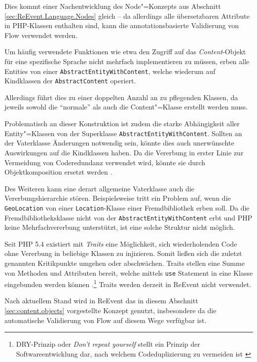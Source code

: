 Dies kommt einer Nachentwicklung des Node"=Konzepts aus Abschnitt \ref{sec:ReEvent.Language.Nodes} gleich -- da allerdings alle übersetzbaren Attribute in PHP-Klassen enthalten sind, kann die annotationsbasierte Validierung von Flow verwendet werden.

Um häufig verwendete Funktionen wie etwa den Zugriff auf das \emph{Content}-Objekt für eine spezifische Sprache nicht mehrfach implementieren zu müssen, erben alle Entities von einer \texttt{AbstractEntityWithContent}, welche wiederum auf Kindklassen der \texttt{AbstractContent} operiert.

Allerdings führt dies zu einer doppelten Anzahl an zu pflegenden Klassen, da jeweils sowohl die \enquote{normale} als auch die Content"=Klasse erstellt werden muss.

Problematisch an dieser Konstruktion ist zudem die starke Abhängigkeit aller Entity"=Klassen von der Superklasse \texttt{AbstractEntityWithContent}. Sollten an der Vaterklasse Änderungen notwendig sein, könnte dies auch unerwünschte Auswirkungen auf die Kindklassen haben. Da die Vererbung in erster Linie zur Vermeidung von Coderedundanz verwendet wird, könnte sie durch Objektkomposition ersetzt werden \cite[S. 506f]{Balzert.2011}.

Des Weiteren kann eine derart allgemeine Vaterklasse auch die Vererbungshierarchie stören. Beispielsweise tritt ein Problem auf, wenn die \texttt{GeoLocation} von einer \texttt{Location}-Klasse einer Fremdbibliothek erben soll. Da die Fremdbibliotheksklasse nicht von der \texttt{AbstractEntityWithContent} erbt und PHP keine Mehrfachvererbung unterstützt, ist eine solche Struktur nicht möglich.

Seit PHP 5.4 existiert mit \emph{Traits} eine Möglichkeit, sich wiederholenden Code ohne Vererbung in beliebige Klassen zu injizieren. Somit ließen sich die zuletzt genannten Kritikpunkte umgehen oder abschwächen. Traits stellen eine Summe von Methoden und Attributen bereit, welche mittels \texttt{use} Statement in eine Klasse eingebunden werden können \cite[S. 17-19]{Lockhart.2015}.\footnote{DRY-Prinzip oder \emph{Don't repeat yourself} stellt ein Prinzip der Softwareentwicklung dar, nach welchem Codeduplizierung zu vermeiden ist \cite[S. 289f]{Martin.2009}} Traits werden derzeit in ReEvent nicht verwendet.

Nach aktuellem Stand wird in ReEvent das in diesem Abschnitt \ref{sec:content.objects} vorgestellte Konzept genutzt, insbesondere da die automatische Validierung von Flow auf diesem Wege verfügbar ist.


